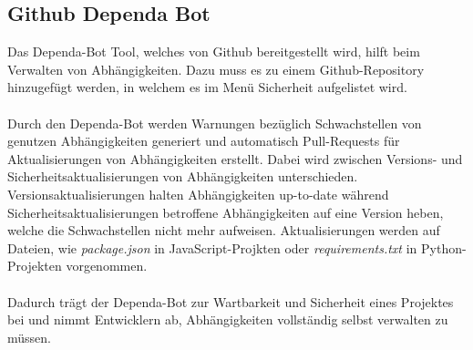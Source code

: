 \subsection{Github Dependa Bot} \label{sec:Dependa}
Das Dependa-Bot Tool, welches von Github bereitgestellt wird, hilft beim Verwalten von Abhängig\-keiten.
Dazu muss es zu einem Github-Repository hinzugefügt werden, in welchem es im Menü Sicherheit aufgelistet wird.
\\ \\
Durch den Dependa-Bot werden Warnungen bezüglich Schwachstellen von genutzen Abhängigkeiten generiert und automatisch Pull-Requests für Aktualisierungen von Abhängigkeiten erstellt.
Dabei wird zwischen Versions- und Sicherheitsaktualisierungen von Abhängigkeiten unterschieden.
Versionsaktualisierungen halten Abhängigkeiten up-to-date während Sicherheitsaktualisierungen betroffene Abhängigkeiten auf eine Version heben, welche die Schwachstellen nicht mehr aufweisen.
Aktualisierungen werden auf Dateien, wie \textit{package.json} in JavaScript-Projkten oder \textit{requirements.txt} in Python-Projekten vorgenommen.
\\ \\
Dadurch trägt der Dependa-Bot zur Wartbarkeit und Sicherheit eines Projektes bei und nimmt Entwicklern ab, Abhängigkeiten vollständig selbst verwalten zu müssen.